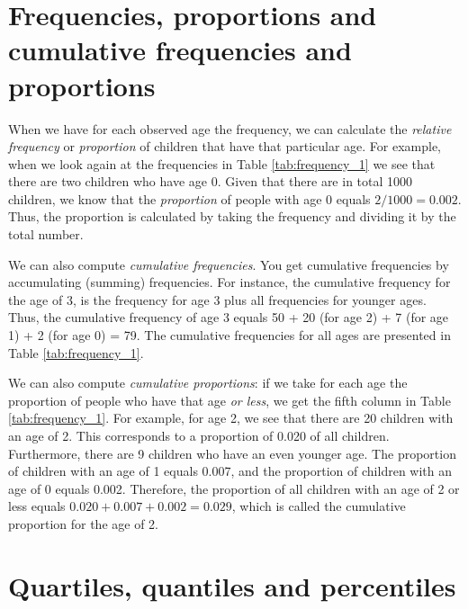\section{Frequencies, proportions and cumulative frequencies and proportions}


When we have for each observed age the frequency, we can calculate the \textit{relative frequency} or \textit{proportion} of children that have that particular age. For example, when we look again at the frequencies in Table \ref{tab:frequency_1} we see that there are two children who have age 0. Given that there are in total 1000 children, we know that the \textit{proportion} of people with age 0 equals $2/1000=0.002$. Thus, the proportion is calculated by taking the frequency and dividing it by the total number.


We can also compute \textit{cumulative frequencies}. You get cumulative frequencies by accumulating (summing) frequencies. For instance, the cumulative frequency for the age of 3, is the frequency for age 3 plus all frequencies for younger ages. Thus, the cumulative frequency of age 3 equals 50 + 20 (for age 2) + 7 (for age 1) + 2 (for age 0) = 79. The cumulative frequencies for all ages are presented in Table \ref{tab:frequency_1}.

We can also compute \textit{cumulative proportions}: if we take for each age the proportion of people who have that age \textit{or less}, we get the fifth column in Table \ref{tab:frequency_1}. For example, for age 2, we see that there are 20 children with an age of 2. This corresponds to a proportion of 0.020 of all children. Furthermore, there are 9 children who have an even younger age. The proportion of children with an age of 1 equals 0.007, and the proportion of children with an age of 0 equals 0.002. Therefore, the proportion of all children with an age of 2 or less equals $0.020+0.007+0.002=0.029$, which is called the cumulative proportion for the age of 2.



\section{Quartiles, quantiles and percentiles}

